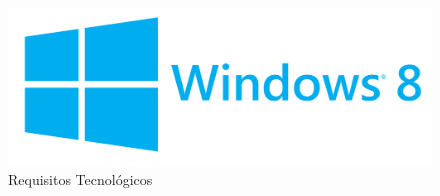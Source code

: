 \documentclass[11pt]{article} %
\begin{document}
\begin{figure}[tb]
\begin{center}
  \includegraphics[scale=0.05]{res/windows.png} \quad
\caption{Requisitos Tecnológicos} \label{gdimotes}
\end{center}
\end{figure}
\end{document}
